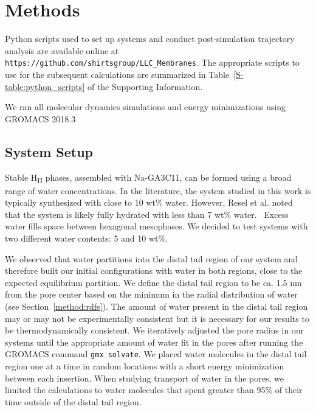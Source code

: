 \documentclass[journal=jpcbfk,manuscript=article]{achemso}
\begin{document}
  \section{Methods}
  
  Python scripts used to set up systems and conduct post-simulation trajectory 
  analysis are available online at \texttt{https://github.com/shirtsgroup/LLC\_Membranes}. 
  The appropriate scripts to use for the subsequent calculations are summarized in 
  Table~\ref{S-table:python_scripts} of the Supporting Information.
  
  We ran all molecular dynamics simulations and energy minimizations using GROMACS 2018.3 \cite{bekker_gromacs:_1993,berendsen_gromacs:_1995,van_der_spoel_gromacs:_2005,hess_gromacs_2008} 
  
  \subsection{System Setup}\label{method:system_setup}

  Stable H\textsubscript{II} phases, assembled with Na-GA3C11, can be formed
  using a broad range of water concentrations. In the literature, the system 
  studied in this work is typically synthesized with close to 10 wt\% water.
  \cite{smith_ordered_1997, zhou_new_2007} However, Resel et al. noted that the
  system is likely fully hydrated with less than 7 wt\% water.~\cite{resel_h2-phase_2000}
  Excess water fills space between hexagonal mesophases. We decided to test 
  systems with two different water contents: 5 and 10 wt\%.

  We observed that water partitions into the distal tail region of our system and therefore
  built our initial configurations with water in both regions, close to the expected
  equilibrium partition. We define the distal tail region to be ca. 1.5 nm from the pore
  center based on the minimum in the radial distribution of water
  (see Section~\ref{method:rdfs}). The amount of water present in the distal tail region
  may or may not be experimentally consistent but it is necessary for our results to be 
  thermodynamically consistent. We iteratively adjusted the pore radius in our systems
  until the appropriate amount of water fit in the pores after running the GROMACS command
  \texttt{gmx solvate}. We placed water molecules in the distal tail region one at a time
  in random locations with a short energy minimization between each insertion. When 
  studying transport of water in the pores, we limited the calculations to water molecules
  that spent greater than 95\% of their time outside of the distal tail region.
\end{document}
